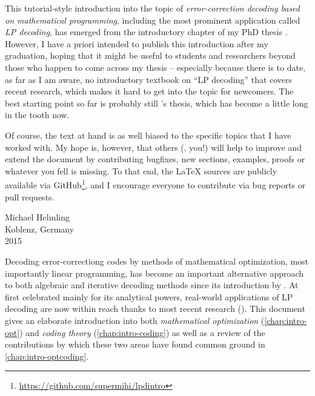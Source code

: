 \documentclass[
  paper=a4,
  parskip=half,
  english,
  fontsize=11pt,
  DIV=9,
  twoside=true,
  toc=bib,
  numbers=noendperiod
]{scrbook}
\title{\mytitle}
\subtitle{A tutorial}
\author{\myauthor}
\theoremstyle{change}
\theoremstyle{nonumberplain}
\begin{document}
\maketitle
\tableofcontents

This tutorial-style introduction into the topic of \emph{error-correction decoding based on mathematical programming}, including the most prominent application called \emph{LP decoding}, has emerged from the introductory chapter of my PhD thesis \cite{Helmling15PhD}. However, I have a priori intended to publish this introduction after my graduation, hoping that it might be useful to students and researchers beyond those who happen to come across my thesis – especially because there is to date, as far as I am aware, no introductory textbook on \enquote{LP decoding} that covers recent research, which makes it hard to get into the topic for newcomers. The best starting point so far is probably still \citeauthor{Feldman03PhD}'s thesis, which has become a little long in the tooth now.

Of course, the text at hand is as well biased to the specific topics that I have worked with. My hope is, however, that others (\ie, you!) will help to improve and extend the document by contributing bugfixes, new sections, examples, proofs or whatever you fell is missing. To that end, the \LaTeX{} sources are publicly available via GitHub\footnote{\url{https://github.com/supermihi/lpdintro}}, and I encourage everyone to contribute via bug reports or pull requests.
\begin{FlushRight}
  Michael Helmling\\
  Koblenz, Germany\\
  2015
\end{FlushRight}

Decoding error-correctiong codes by methods of mathematical optimization, most importantly linear programming, has become an important alternative approach to both algebraic and iterative decoding methods since its introduction by \textcite{Feldman+05LPDecoding}. At first celebrated mainly for its analytical powers, real-world applications of LP decoding are now within reach thanks to most recent research (\cite{Liu+12PenalizedLPD, Gensheimer+14SimplexHard}). This document gives an elaborate introduction into both \emph{mathematical optimization} (\cref{chap:intro-opt}) and \emph{coding theory} (\cref{chap:intro-coding}) as well as a review of the contributions by which these two areas have found common ground in \cref{chap:intro-optcoding}.
\end{document}
